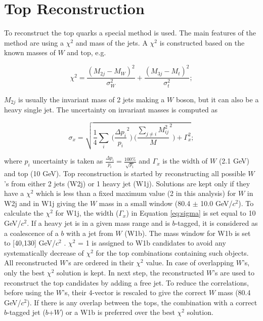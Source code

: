 \section{Top Reconstruction}
\label{sect:top}
To reconstruct the top quarks a special method is used.  
The main features 
of the method are using a $\chi^2$ and mass of the jets. A $\chi^2$ is
constructed based on the known masses of $W$ and top, e.g.
\begin{linenomath}
\begin{equation}
\label{eq:chi2}
\chi^2 = \frac{(M_{2j} - M_W)^2}{\sigma^2_W} + \frac{(M_{3j} - M_t)^2}{\sigma^2_t}; 
\end{equation}
\end{linenomath}
$M_{2j}$ is usually the invariant mass of 2 jets making a $W$ boson, 
but it can also be a heavy single jet. The uncertainty on invariant masses is computed as
\begin{linenomath}
\begin{equation}
\label{eq:sigma}
\sigma_x = \sqrt{\frac{1}{4}\sum_{i} \pod{\frac{\Delta p_i}{p_i}}^2\pod{\frac{\sum_{j \neq i} M_{ij}^2}{M}}^2 + \Gamma_x^2}; 
\end{equation}
\end{linenomath}
where $p_i$ uncertainty is taken as $\frac{\Delta p_i}{p_i} = \frac{100\%}{\sqrt{p_i}}$ and $\Gamma_x$ is the width of $W$ (2.1 GeV) 
and top (10 GeV). Top reconstruction is started by reconstructing all possible $W$'s from either 2 jets (W2j) or 1 heavy jet (W1j).
Solutions are kept only if they have a $\chi^2$ which is less than a fixed maximum value (2 in this analysis) for $W$ in W2j
and in W1j giving the $W$ mass in a small window (80.4 $\pm$ 10.0 GeV/$c^2$). To calculate the $\chi^2$ for W1j, the width ($\Gamma_x$) in 
Equation \ref{eq:sigma} is set equal to 10 GeV/$c^2$. If a heavy jet is in a given mass range and is $b$-tagged, 
it is considered as a coalescence of a $b$ with a jet from $W$ (W1b). The mass window for W1b is set to [40,130] GeV/$c^2$ . 
$\chi^2$ = 1 is assigned to W1b candidates to avoid any systematically decrease of $\chi^2$ for the top combinations containing such objects.
All reconstructed $W$'s are ordered in their $\chi^2$ value. In case of overlapping $W$'s, only the best $\chi^2$ solution is kept. 
In next step, the reconstructed $W$'s are used to reconstruct the top candidates by adding a free jet. To reduce the correlations,
before using the $W$'s, their 4-vector is rescaled to give the correct $W$ mass (80.4 GeV/$c^2$). If there is any overlap between the tops, 
the combination with a correct $b$-tagged jet ($b$+$W$) or a W1b is preferred over the best $\chi^2$ solution. 

